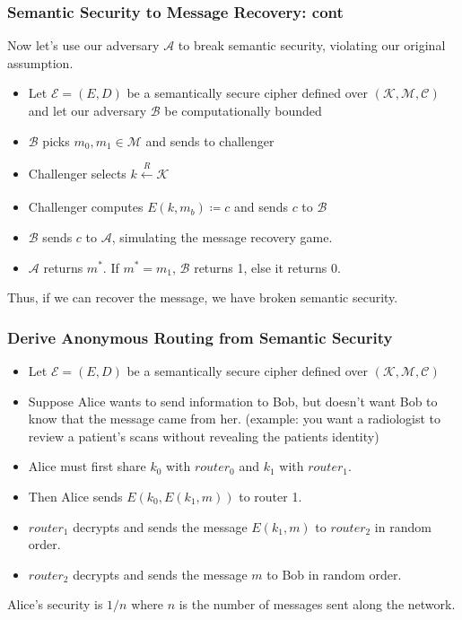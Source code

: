 \documentclass{beamer}
\begin{document}
\begin{frame}
\frametitle{Semantic Security to Message Recovery: cont}
    Now let's use our adversary \(\mathcal{A}\) to break semantic security, violating our original assumption.
    \begin{itemize}
        \item Let \(\mathcal{E} = (E, D)\) be a semantically secure cipher defined over \((\mathcal{K}, \mathcal{M}, \mathcal{C})\) and let our adversary \(\mathcal{B}\) be computationally bounded \pause
        \item \(\mathcal{B}\) picks \(m_0, m_1 \in \mathcal{M}\) and sends to challenger \pause
        \item Challenger selects \(k \xleftarrow[]{R} \mathcal{K}\) \pause
        \item Challenger computes \(E(k, m_b) \coloneqq c \) and sends \(c\) to \(\mathcal{B}\) \pause
        \item \(\mathcal{B}\) sends \(c\) to \(\mathcal{A}\), simulating the message recovery game. \pause
        \item \(\mathcal{A}\) returns \(m^{*}\). If \(m^{*} = m_1\), \(\mathcal{B}\) returns 1, else it returns 0. \pause
    \end{itemize} 
    Thus, if we can recover the message, we have broken semantic security.
\end{frame}

\begin{frame}
\frametitle{Derive Anonymous Routing from Semantic Security}
    \begin{itemize}
        \item Let \(\mathcal{E} = (E, D)\) be a semantically secure cipher defined over \((\mathcal{K}, \mathcal{M}, \mathcal{C})\) \pause
        \item Suppose Alice wants to send information to Bob, but doesn't want Bob to know that the message came from her. \pause (example: you want a radiologist to review a patient's scans without revealing the patients identity) \pause
        \item Alice must first share \(k_0\) with \(router_0\) and \(k_1\) with \(router_1\). \pause
        \item Then Alice sends \(E(k_0, E(k_1, m))\) to router 1. \pause
        \item \(router_1\) decrypts and sends the message \(E(k_1, m)\) to \(router_2\) in random order. \pause
        \item \(router_2\) decrypts and sends the message \(m\) to Bob in random order.\pause
    \end{itemize} 
    
    Alice's security is \(1 / n\) where \(n\) is the number of messages sent along the network.

\end{frame}

 
\end{document}
